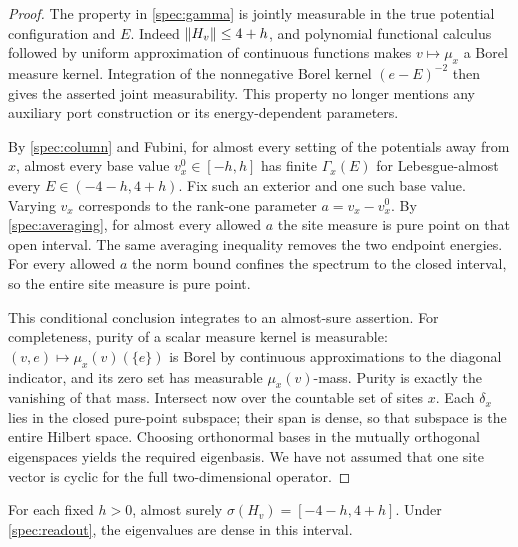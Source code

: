 \begin{proof}
The property in \cref{spec:gamma} is jointly measurable in the true
potential configuration and $E$. Indeed $\left\lVert H_v\right\rVert\le4+h$, and
polynomial functional calculus followed by uniform approximation of
continuous functions makes $v\mapsto\mu_x$ a Borel measure kernel.
Integration of the nonnegative Borel kernel $(e-E)^{-2}$ then gives
the asserted joint measurability. This property no longer mentions
any auxiliary port construction or its energy-dependent parameters.

By \cref{spec:column} and Fubini, for almost every setting of the
potentials away from $x$, almost every base value $v_x^0\in[-h,h]$
has finite $\Gamma_x(E)$ for Lebesgue-almost every
$E\in(-4-h,4+h)$. Fix such an exterior and one such base value.
Varying $v_x$ corresponds to the rank-one parameter $a=v_x-v_x^0$.
By \cref{spec:averaging}, for almost every allowed $a$ the site
measure is pure point on that open interval. The same averaging
inequality removes the two endpoint energies. For every allowed $a$
the norm bound confines the spectrum to the closed interval, so the
entire site measure is pure point.

This conditional conclusion integrates to an almost-sure assertion.
For completeness, purity of a scalar measure kernel is measurable:
$(v,e)\mapsto\mu_x(v)(\{e\})$ is Borel by continuous approximations
to the diagonal indicator, and its zero set has measurable
$\mu_x(v)$-mass. Purity is exactly the vanishing of that mass.
Intersect now over the countable set of sites $x$. Each $\delta_x$
lies in the closed pure-point subspace; their span is dense, so that
subspace is the entire Hilbert space. Choosing orthonormal bases in
the mutually orthogonal eigenspaces yields the required eigenbasis.
We have not assumed that one site vector is cyclic for the full
two-dimensional operator.
\end{proof}

\begin{proposition}\label{spec:spectrum}
For each fixed $h>0$, almost surely
$\sigma(H_v)=[-4-h,4+h]$. Under \cref{spec:readout}, the eigenvalues
are dense in this interval.
\end{proposition}

